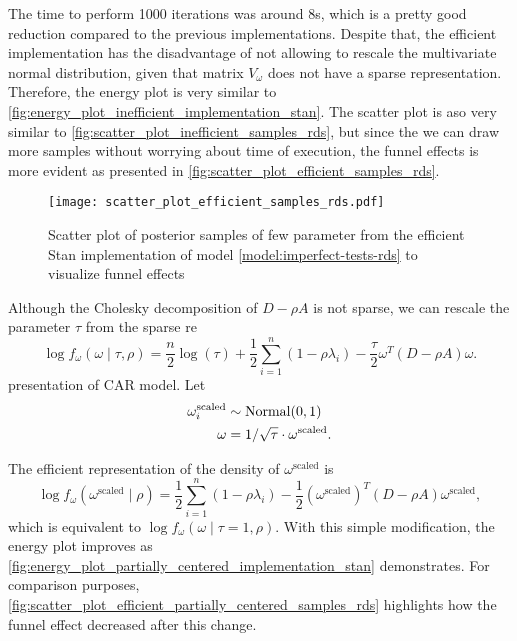 The time to perform 1000 iterations was around 8s, which is a pretty good
reduction compared to the previous implementations. Despite that, the
efficient implementation has the disadvantage of not
allowing to rescale the multivariate normal distribution, given that matrix $V_{\omega}$ does not have
a sparse representation. Therefore, the energy plot is very similar to
\autoref{fig:energy_plot_inefficient_implementation_stan}. The scatter plot is
aso very similar to \autoref{fig:scatter_plot_inefficient_samples_rds}, but
since the we can draw more samples without worrying about time of execution,
the funnel effects is more evident as presented in \autoref{fig:scatter_plot_efficient_samples_rds}.

\begin{figure}[htb]
  \centering
  \caption{\label{fig:scatter_plot_efficient_samples_rds}Scatter plot 
  of posterior samples of few parameter from the efficient Stan implementation of model
  \eqref{model:imperfect-tests-rds} to visualize funnel effects}
  \texttt{[image: scatter\_plot\_efficient\_samples\_rds.pdf]}
\end{figure}

Although the Cholesky decomposition of $D - \rho A$ is not sparse, we can
rescale the parameter $\tau$ from the sparse re\begin{equation*}
  \log f_{\omega}(\omega \mid \tau, \rho) = \frac{n}{2}\log(\tau) + 
  \frac{1}{2}\sum_{i=1}^n(1 - \rho \lambda_i) - \frac{\tau}{2}\omega^T(D - \rho A)\omega.
\end{equation*}presentation of CAR model. Let 
\begin{align*}
  \omega^{\mathrm{scaled}}_i &\sim \operatorname{Normal}(0,1) \\ 
  \omega &= 1/\sqrt{\tau} \cdot \omega^{\mathrm{scaled}}.
\end{align*}

The efficient representation of the density of $\omega^{\mathrm{scaled}}$ is 
\begin{equation*}
  \log f_{\omega}(\omega^{\mathrm{scaled}} \mid \rho) = 
  \frac{1}{2}\sum_{i=1}^n(1 - \rho \lambda_i) 
  - \frac{1}{2}(\omega^{\mathrm{scaled}})^T(D - \rho A)\omega^{\mathrm{scaled}},
\end{equation*}
which is equivalent to $\log f_{\omega}(\omega \mid \tau=1, \rho)$. With this
simple modification, the energy plot improves as
\autoref{fig:energy_plot_partially_centered_implementation_stan} demonstrates.
For comparison purposes,
\autoref{fig:scatter_plot_efficient_partially_centered_samples_rds} 
highlights how the funnel effect decreased after this change. 

